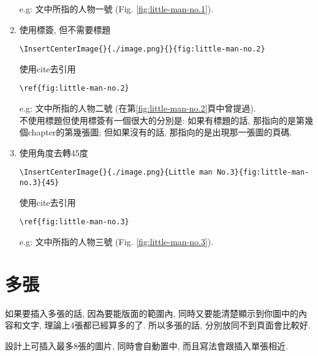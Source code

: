 \begin{enumerate}
{      e.g: 文中所指的人物一號 (Fig. \ref{fig:little-man-no.1}).
    } %

    \newpage

    \item
    {
      使用標簽, 但不需要標題\begin{verbatim}\InsertCenterImage{}{./image.png}{}{fig:little-man-no.2}\end{verbatim}
      使用cite去引用\begin{verbatim}\ref{fig:little-man-no.2}\end{verbatim}

      e.g: 文中所指的人物二號 (在第\ref{fig:little-man-no.2}頁中曾提過). \\

      不使用標題但使用標簽有一個很大的分別是: 如果有標題的話, 那指向的是第幾個chapter的第幾張圖; 但如果沒有的話, 那指向的是出現那一張圖的頁碼.
    } %

    \item
    {
      使用角度去轉45度\begin{verbatim}\InsertCenterImage{}{./image.png}{Little man No.3}{fig:little-man-no.3}{45}\end{verbatim}
      使用cite去引用\begin{verbatim}\ref{fig:little-man-no.3}\end{verbatim}


      e.g: 文中所指的人物三號 (Fig. \ref{fig:little-man-no.3}).
    } %

  \end{enumerate}

\newpage
\section{多張}

  如果要插入多張的話, 因為要能版面的範圍內, 同時又要能清楚顯示到你圖中的內容和文字, 理論上4張都已經算多的了. 所以多張的話, 分別放同不到頁面會比較好.

  設計上可插入最多8張的圖片, 同時會自動置中, 而且寫法會跟插入單張相近.

